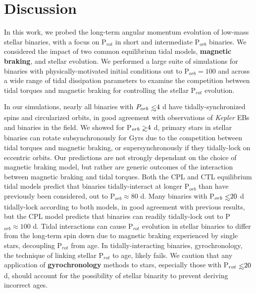 \documentclass[twocolumn]{aastex61}
\def\gsim{~\rlap{$>$}{\lower 1.0ex\hbox{$\sim$}}}
\def\lsim{~\rlap{$<$}{\lower 1.0ex\hbox{$\sim$}}}
\newcommand{\xxx}[1]{{\textbf{#1}}}
\newcommand{\kepler}[0]{\textit{Kepler}\xspace}
\begin{document}

\section{Discussion} \label{sec:discussion}

In this work, we probed the long-term angular momentum evolution of low-mass stellar binaries, with a focus on P$_{rot}$ in short and intermediate P$_{orb}$ binaries.  We considered the impact of two common equilibrium tidal models, \xxx{magnetic braking}, and stellar evolution.  We performed a large suite of simulations for binaries with physically-motivated initial conditions out to P$_{orb} = 100$ and across a wide range of tidal dissipation parameters to examine the competition between tidal torques and magnetic braking for controlling the stellar P$_{rot}$ evolution. 

In our simulations, nearly all binaries with $P_{orb} \lsim 4$ d have tidally-synchronized spins and circularized orbits, in good agreement with observations of \kepler EBs and binaries in the field. We showed for P$_{orb} \gsim 4$ d, primary stars in stellar binaries can rotate subsynchronously for Gyrs due to the competition between tidal torques and magnetic braking, or supersynchronously if they tidally-lock on eccentric orbits. Our predictions are not strongly dependant on the choice of magnetic braking model, but rather are generic outcomes of the interaction between magnetic braking and tidal torques.  Both the CPL and CTL equilibrium tidal models predict that binaries tidally-interact at longer P$_{orb}$ than have previously been considered, out to P$_{orb} \approx 80$ d. Many binaries with P$_{orb} \lsim 20$ d tidally-lock according to both models, in good agreement with previous results, but the CPL model predicts that binaries can readily tidally-lock out to P$_{orb} \approx 100$ d. Tidal interactions can cause P$_{rot}$ evolution in stellar binaries to differ from the long-term spin down due to magnetic braking experienced by single stars, decoupling P$_{rot}$ from age.  In tidally-interacting binaries, gyrochronology, the technique of linking stellar P$_{rot}$ to age, likely fails. We caution that any application of \xxx{gyrochronology} methods to stars, especially those with P$_{rot} \lsim 20$ d, should account for the possibility of stellar binarity to prevent deriving incorrect ages. 
\end{document}
